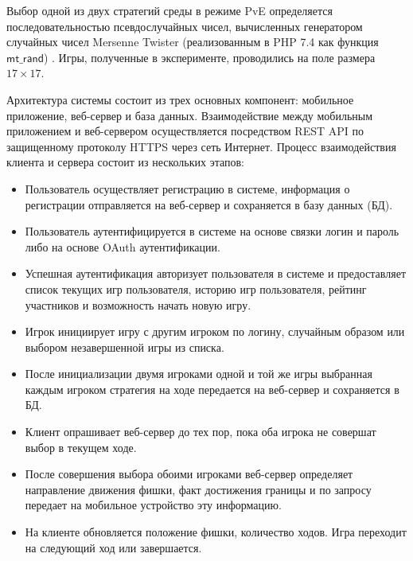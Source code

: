 Выбор одной из двух стратегий среды в режиме PvE определяется последовательностью псевдослучайных чисел, вычисленных генератором случайных чисел Mersenne Twister (реализованным в PHP 7.4 как функция $\mathsf{mt\_rand}$) \cite{matsumoto_mersenne_1998}. Игры, полученные в эксперименте, проводились на поле размера $17 \times 17$.


Архитектура системы состоит из трех основных компонент: мобильное приложение, веб-сервер и база данных. Взаимодействие между мобильным приложением и веб-сервером осуществляется посредством REST API по защищенному протоколу HTTPS через сеть Интернет. Процесс взаимодействия клиента и сервера состоит из нескольких этапов:
\begin{itemize}
\item Пользователь осуществляет регистрацию в системе, информация о регистрации отправляется на веб-сервер и сохраняется в базу данных (БД).
\item Пользователь аутентифицируется в системе на основе связки логин и пароль либо на основе OAuth аутентификации.
\item Успешная аутентификация авторизует пользователя в системе и предоставляет список текущих игр пользователя, историю игр пользователя, рейтинг участников и возможность начать новую игру.
\item Игрок инициирует игру с другим игроком по логину, случайным образом или выбором незавершенной игры из списка.
\item После инициализации двумя игроками одной и той же игры выбранная каждым игроком стратегия на ходе передается на веб-сервер и сохраняется в БД.
\item Клиент опрашивает веб-сервер до тех пор, пока оба игрока не совершат выбор в текущем ходе.
\item После совершения выбора обоими игроками веб-сервер определяет направление движения фишки, факт достижения границы и по запросу передает на мобильное устройство эту информацию.
\item На клиенте обновляется положение фишки, количество ходов. Игра переходит на следующий ход или завершается.
\end{itemize}


